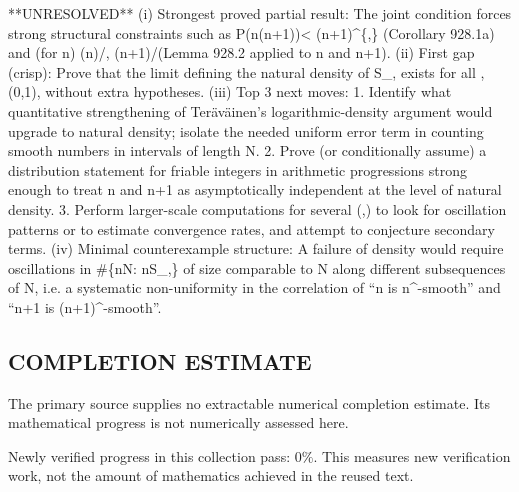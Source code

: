 **UNRESOLVED**
(i) Strongest proved partial result: The joint condition forces strong structural constraints such as P(n(n+1))< (n+1)^{\max\{\alpha,\beta\}} (Corollary 928.1a) and (for n) \Omega(n)\ge {}/\alpha\rceil, \Omega(n+1)\ge {}/\beta\rceil (Lemma 928.2 applied to n and n+1).
(ii) First gap (crisp): Prove that the limit defining the natural density of S_{\alpha,\beta} exists for all \alpha,\beta\in(0,1), without extra hypotheses.
(iii) Top 3 next moves:
  1. Identify what quantitative strengthening of Ter\"{a}v\"{a}inen’s logarithmic-density argument would upgrade to natural density; isolate the needed uniform error term in counting smooth numbers in intervals of length \asymp N.
  2. Prove (or conditionally assume) a distribution statement for friable integers in arithmetic progressions strong enough to treat n and n+1 as asymptotically independent at the level of natural density.
  3. Perform larger-scale computations for several (\alpha,\beta) to look for oscillation patterns or to estimate convergence rates, and attempt to conjecture secondary terms.
(iv) Minimal counterexample structure: A failure of density would require oscillations in \#\{n\le N: n\in S_{\alpha,\beta}\} of size comparable to N along different subsequences of N, i.e. a systematic non-uniformity in the correlation of “n is n^\alpha-smooth” and “n+1 is (n+1)^\beta-smooth”.




\subsection*{COMPLETION ESTIMATE}
The primary source supplies no extractable numerical completion estimate. Its mathematical progress is not numerically assessed here.

Newly verified progress in this collection pass: $0\%$. This measures new verification work, not the amount of mathematics achieved in the reused text.
